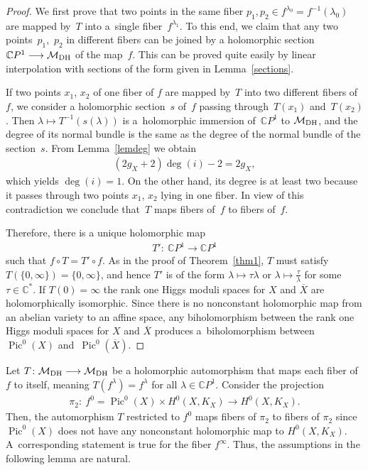 \documentclass[pdftex]{sigma}
\numberwithin{equation}{section}
\begin{document}
\begin{proof} We f\/irst prove that two points in the same f\/iber $p_1, p_2 \in f^{\lambda_0} = f^{-1}(\lambda_0)$ are mapped by~$T$ into a~single f\/iber~$f^{\lambda_1}$. To this end, we claim that any two points~$p_1$,~$p_2$ in dif\/ferent f\/ibers can be joined by a holomorphic section ${\mathbb C}P^1 \longrightarrow {\mathcal M}_{\rm DH}$ of the map~$f$. This can be proved quite easily by linear interpolation with sections of the form given in Lemma~\ref{sections}.

If two points $x_1$, $x_2$ of one f\/iber of $f$ are mapped by~$T$ into two dif\/ferent f\/ibers of $f$, we consider a holomorphic section~$s$ of~$f$ passing through~$T(x_1)$ and~$T(x_2)$. Then $\lambda \longmapsto T^{-1}(s(\lambda))$ is a~holomorphic immersion of~${\mathbb C}P^1$ to ${\mathcal M}_{\rm DH}$, and the degree of its normal bundle is the same as the degree of the normal bundle of the section~$s$. From Lemma~\ref{lemdeg} we obtain
\begin{gather*}(2 g_X+2)\deg (i)-2=2g_X,\end{gather*}
which yields $\deg (i)=1$. On the other hand, its degree is at least two because it passes through two points $x_1$, $x_2$ lying in one f\/iber. In view of this contradiction we conclude that~$T$ maps f\/ibers of~$f$ to f\/ibers of~$f$.

Therefore, there is a unique holomorphic map
\begin{gather*}T'\colon \ {\mathbb C}P^1 \longrightarrow {\mathbb C}P^1\end{gather*}
such that $f\circ T = T'\circ f$. As in the proof of Theorem~\ref{thm1}, $T$ must satisfy $T(\{0,\infty\}) = \{0,\infty\}$, and hence $T'$ is of the form $\lambda \longmapsto \tau\lambda$ or $\lambda \longmapsto \frac{\tau}{\lambda}$ for some $\tau \in \mathbb C^*$. If $T(0) = \infty$ the rank one Higgs moduli spaces for $X$ and $\overline X$ are holomorphically isomorphic. Since there is no nonconstant holomorphic map from an abelian variety
to an af\/f\/ine space, any biholomorphism between the rank one Higgs moduli spaces for $X$ and $\overline X$ produces a~biholomorphism between~$\operatorname{Pic}^0(X)$ and~$\operatorname{Pic}^0(\overline{X})$.
\end{proof}

Let $T \colon {\mathcal M}_{\rm DH} \longrightarrow {\mathcal M}_{\rm DH}$ be a holomorphic automorphism that maps each f\/iber of $f$ to itself, meaning $T(f^\lambda) = f^\lambda$ for all $\lambda \in {\mathbb C}P^1$. Consider the projection
\begin{gather}\label{pi2}
\pi_2 \colon \ f^0  = \operatorname{Pic}^0(X)\times H^0(X, K_X) \longrightarrow H^0(X, K_X) .
\end{gather}
Then, the automorphism $T$ restricted to $f^0$ maps f\/ibers of $\pi_2$ to f\/ibers of $\pi_2$ since $\operatorname{Pic}^0(X)$ does not have any nonconstant holomorphic map to $H^0(X, K_X)$. A~corresponding statement is true for the f\/iber $f^\infty$. Thus, the assumptions in the following
lemma are natural.
\end{document}
